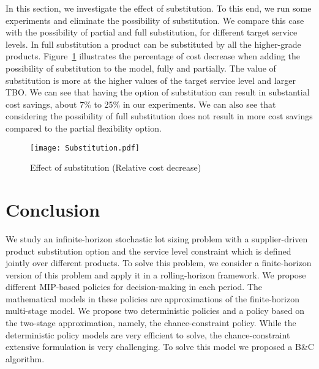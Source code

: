 \documentclass[11pt]{article}
\begin{document}
In this section, we investigate the effect of substitution. To this end, we run some experiments and eliminate the possibility of substitution. We compare this case with the possibility of partial and full substitution, for different target service levels. In full substitution a product can be substituted by all the higher-grade products. Figure~\ref{fig:sustitution} illustrates the percentage of cost decrease when adding the possibility of substitution to the model, fully and partially. The value of substitution is more at the higher values of the target service level and larger TBO. We can see that having the option of substitution can result in substantial cost savings, about 7\% to 25\% in our experiments. We can also see that considering the possibility of full substitution does not result in more cost savings compared to the partial flexibility option.



\begin{figure}[!h]
\begin{center}
\texttt{[image: Substitution.pdf]}
\caption{Effect of substitution (Relative cost decrease)} 
\label{fig:sustitution}
\end{center}
\end{figure}




\section{Conclusion}

We study an infinite-horizon stochastic lot sizing problem with a supplier-driven product substitution option and the service level constraint which is defined jointly over different products. To solve this problem, we consider a finite-horizon version of this problem and apply it in a rolling-horizon framework. We propose different MIP-based policies for decision-making in each period. The mathematical models in these policies are approximations of the finite-horizon multi-stage model. We propose two deterministic policies and a policy based on the two-stage approximation, namely, the chance-constraint policy. While the deterministic policy models are very efficient to solve, the chance-constraint extensive formulation is very challenging. To solve this model we proposed a B\&C algorithm. 
\end{document}
